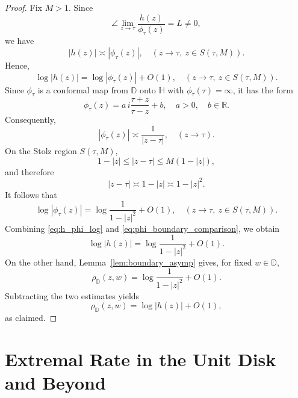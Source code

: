 \documentclass[12pt]{amsart}
\numberwithin{equation}{section}
\theoremstyle{plain}
\theoremstyle{definition}
\begin{document}
\begin{proof}
Fix $M>1$. Since
\begin{equation*}
\angle\lim_{z\to\tau}\frac{h(z)}{\phi_\tau(z)}
=L\neq0,
\end{equation*}
we have
\begin{equation*}
|h(z)|\asymp |\phi_\tau(z)|,
\quad
(z\to\tau,\ z\in S(\tau,M)).
\end{equation*}
Hence,
\begin{equation}
\label{eq:h_phi_log}
\log|h(z)|
=
\log|\phi_\tau(z)|+O(1),
\quad
(z\to\tau,\ z\in S(\tau,M)).
\end{equation}
Since $\phi_\tau$ is a conformal map from $\mathbb{D}$ onto
$\mathbb{H}$ with $\phi_\tau(\tau)=\infty$, it has the form
\begin{equation*}
\phi_\tau(z)
=
a\,i\frac{\tau+z}{\tau-z}+b,
\quad a>0,\quad b\in\mathbb{R}.
\end{equation*}
Consequently,
\begin{equation*}
|\phi_\tau(z)|\asymp\frac{1}{|z-\tau|},
\quad (z\to\tau).
\end{equation*}
On the Stolz region $S(\tau,M)$,
\begin{equation*}
1-|z|
\le |z-\tau|
\le M(1-|z|),
\end{equation*}
and therefore
\begin{equation*}
|z-\tau|\asymp1-|z|\asymp1-|z|^2.
\end{equation*}
It follows that
\begin{equation}
\label{eq:phi_boundary_comparison}
\log|\phi_\tau(z)|
=
\log\frac{1}{1-|z|^2}+O(1),
\quad
(z\to\tau,\ z\in S(\tau,M)).
\end{equation}
Combining \eqref{eq:h_phi_log} and
\eqref{eq:phi_boundary_comparison}, we obtain
\begin{equation*}
\log|h(z)|
=
\log\frac{1}{1-|z|^2}+O(1).
\end{equation*}
On the other hand, Lemma~\ref{lem:boundary_asymp} gives, for fixed
$w\in\mathbb{D}$,
\begin{equation*}
\rho_{\mathbb{D}}(z,w)
=
\log\frac{1}{1-|z|^2}+O(1).
\end{equation*}
Subtracting the two estimates yields
\begin{equation*}
\rho_{\mathbb{D}}(z,w)
=
\log|h(z)|+O(1),
\end{equation*}
as claimed.
\end{proof}


\section{Extremal Rate in the Unit Disk and Beyond}
\label{sec:uds}
\end{document}
